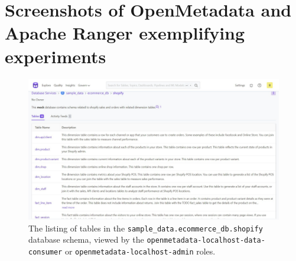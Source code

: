 \chapter[Screenshots of experiments]{Screenshots of OpenMetadata and Apache Ranger exemplifying experiments}
\label{cha:exp_appendix} 

\begin{figure}[h]
    \centering
    \includegraphics[width=\textwidth]{chapters/appendix/figures/exp/1/tables.pdf}
    \caption{The listing of tables in the \texttt{sample_data.ecommerce_db.shopify} database schema, viewed by the \texttt{openmetadata-localhost-data-consumer} or \texttt{openmetadata-localhost-admin} roles.}
    \label{fig:exp_1_talbes}
\end{figure}

